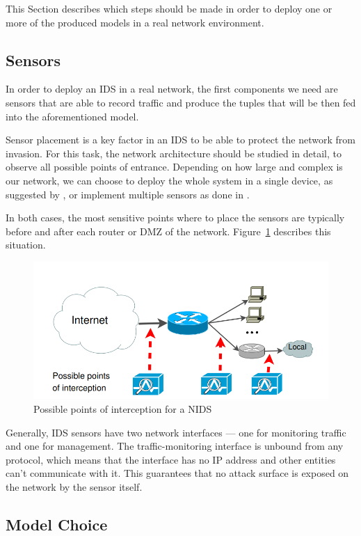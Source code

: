 This Section describes which steps should be made in order to deploy one or more of the produced models in a real network environment.

\subsection{Sensors}

In order to deploy an IDS in a real network, the first components we need are sensors that are able to record traffic and produce the tuples that will be then fed into the aforementioned model.

Sensor placement is a key factor in an IDS to be able to protect the network from invasion. For this task, the network architecture should be studied in detail, to observe all possible points of entrance.
Depending on how large and complex is our network, we can choose to deploy the whole system in a single device, as suggested by \cite{dpl}, or implement multiple sensors as done in \cite{dpl2}.

In both cases, the most sensitive points where to place the sensors are typically before and after each router or DMZ of the network. Figure~\ref{fig:dpl} describes this situation.

\begin{figure}[h]
    \centering
    \includegraphics[width=\linewidth]{img/dpl.png}
    \caption{Possible points of interception for a NIDS}
    \label{fig:dpl}
\end{figure}

Generally, IDS sensors have two network interfaces — one for monitoring traffic and one for management. The traffic-monitoring interface is unbound from any protocol, which means that the interface has no IP address and other entities can't communicate with it. This guarantees that no attack surface is exposed on the network by the sensor itself.

\subsection{Model Choice}

